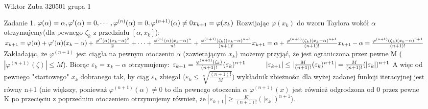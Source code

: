 \documentclass{article}
\begin{document}
 
Wiktor Zuba 320501 grupa 1
\newline

Zadanie 1.
\newline
$
\varphi(\alpha)=\alpha,\varphi'(\alpha)=0,\cdots,\varphi^{(n)}(\alpha)=0,\varphi^{(n+1)}(\alpha)\neq0\newline
x_{k+1}=\varphi(x_k)\newline\newline
$
Rozwijając $\varphi(x_k)$ do wzoru Taylora wokół $\alpha$ otrzymujemy(dla pewnego $\zeta_k$ z przedziału $[\alpha,x_k]$):\newline
$
x_{k+1}=\varphi(\alpha)+\varphi'(\alpha)(x_k-\alpha)+\frac{\varphi''(\alpha)(x_k-\alpha)^2}{2}+\cdots+\frac{\varphi^{(n)}(\alpha)(x_k-\alpha)^n}{n!}+\frac{\varphi^{(n+1)}(\zeta_k)(x_k-\alpha)^{n+1}}{(n+1)!}\newline
x_{k+1}=\alpha+\frac{\varphi^{(n+1)}(\zeta_k)(x_k-\alpha)^{n+1}}{(n+1)!}\newline
x_{k+1}-\alpha=\frac{\varphi^{(n+1)}(\zeta_k)(x_k-\alpha)^{n+1}}{(n+1)!}\newline
$
Zakładając, że $\varphi^{(n+1)}$ jest ciągła na pewnym otoczeniu $\alpha$ (zawierającym $x_k$) możemy przyjąć, że jest ograniczona przez pewne M
($|\varphi^{(n+1)}(\zeta)|\le M$). Biorąc $\varepsilon_k=x_k-\alpha$ otrzymujemy:\newline
$
\varepsilon_{k+1}=\frac{\varphi^{(n+1)}(\zeta_k)}{(n+1)!}(\varepsilon_k)^{n+1}\quad\quad\quad
|\varepsilon_{k+1}|\le|\frac{M}{(n+1)!}(\varepsilon_k)^{n+1}|=\frac{M}{(n+1)!}(|\varepsilon_k|)^{n+1}\newline
$
A więc od pewnego "startowego" $x_k$ dobranego tak, by ciąg $\varepsilon_k$ zbiegał ($\varepsilon_k\le\sqrt[n]{\frac{(n+1)!}{M}}$)
wykładnik zbieżności dla wyżej zadanej funkcji iteracyjnej jest równy n+1
(nie większy, ponieważ $\varphi^{(n+1)}(\alpha)\neq0$ to dla pewnego otoczenia $\alpha$ $\varphi^{(n+1)}(x)$ jest również odgrodzona od 0 przez pewne K
po przecięciu z poprzednim otoczeniem otrzymujemy również, że 
$
|\varepsilon_{k+1}|\ge\frac{K}{(n+1)!}(|\varepsilon_k|)^{n+1}
$).
\end{document}
